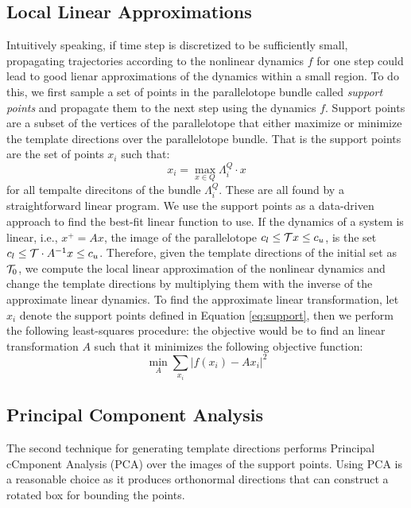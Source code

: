 \subsection{Local Linear Approximations}
\label{sec:lin_app}
%
Intuitively speaking, if time step is discretized to be sufficiently small, propagating trajectories according to the nonlinear dynamics $f$ for one step could lead to good lienar approximations of the dynamics within a small region.
%
%
To do this, we first sample a set of points in the parallelotope bundle called \emph{support points} and propagate them to the next step using the dynamics $f$.
%
Support points are a subset of the vertices of the parallelotope that either maximize or minimize the template directions over the parallelotope bundle.
%
That is the support points are the set of points $x_i$ such that:
\begin{equation}
\label{eq:support}
x_i = \max_{x \in Q} \Lambda^Q_i\cdot x
\end{equation}
%
for all tempalte direcitons of the bundle $\Lambda^Q_i$. These are all found by a straightforward linear program.
%
%
We use the support points as a data-driven approach to find the best-fit linear function to use.
%
If the dynamics of a system is linear, i.e., $x^{+} = Ax$, the image of the parallelotope $c_{l} \leq \mathcal{T} x \leq c_{u}$, is the set $c_{l} \leq \mathcal{T} \cdot A^{-1} x \leq c_{u}$.
%
Therefore, given the template directions of the initial set as $\mathcal{T}_0$, we compute the local linear approximation of the nonlinear dynamics and change the template directions by multiplying them with the inverse of the approximate linear dynamics.
%
To find the approximate linear transformation, let $x_i$ denote the support points defined in Equation \ref{eq:support}, then we perform the following least-squares procedure: the objective would be to find an linear transformation $A$ such that it minimizes the following objective function:
\begin{equation}
  \min_{A} \sum_{x_i} |f(x_i) - Ax_i|^2
\end{equation}

\subsection{Principal Component Analysis}
\label{sec:pca}
The second technique for generating template directions performs Principal cCmponent Analysis (PCA) over the images of the support points.
%
Using PCA is a reasonable choice as it produces orthonormal directions that can construct a rotated box for bounding the points.
%


